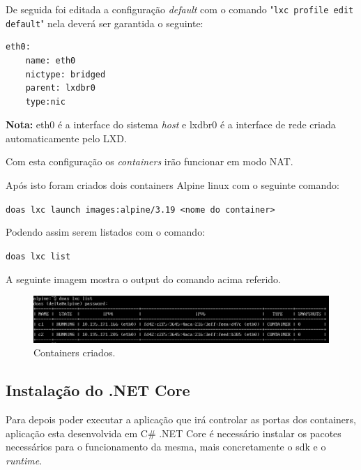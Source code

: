 De seguida foi editada a configuração \textit{default} com o 
comando "\texttt{lxc profile edit default}" nela deverá ser garantida o
seguinte:

\begin{lstlisting}[language=csh, caption={edição do perfil padrão}]
  eth0:
    name: eth0
    nictype: bridged
    parent: lxdbr0
    type:nic

\end{lstlisting}

\textbf{Nota:} eth0 é a interface do sistema \textit{host} e lxdbr0 é a interface
de rede criada automaticamente pelo LXD.

Com esta configuração os \textit{containers} irão funcionar em modo NAT.


Após isto foram criados dois containers Alpine linux com o seguinte 
comando: %

\begin{tcolorbox}[colback=blue!5!white,colframe=blue!75!black]
    \verb |doas lxc launch images:alpine/3.19 <nome do container> |
\end{tcolorbox}

Podendo assim serem listados com o comando:

\begin{tcolorbox}[colback=blue!5!white,colframe=blue!75!black]
    \verb |doas lxc list |
\end{tcolorbox}


A seguinte imagem mostra o output do comando acima referido.

\begin{figure}[H]
\begin{center}
\includegraphics[width=14cm]{figs/lista de containers.png}
\caption{Containers criados.}
\label{fig:bookstack}
\end{center}
\end{figure}



\subsection{Instalação do .NET Core}


Para depois poder executar a aplicação que irá controlar as portas dos containers,
aplicação esta desenvolvida em C\# .NET Core é necessário instalar os pacotes necessários
para o funcionamento da mesma, mais concretamente o sdk e o \textit{runtime}.

